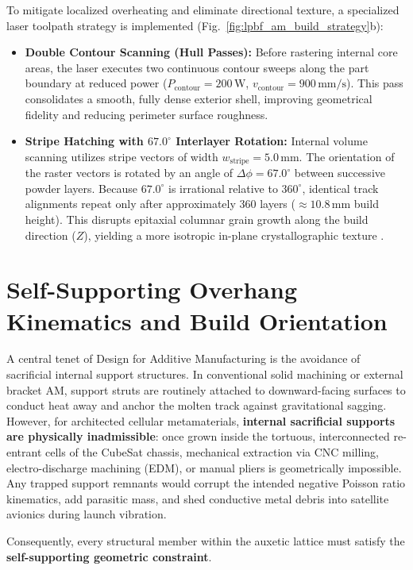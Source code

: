 To mitigate localized overheating and eliminate directional texture, a specialized laser toolpath strategy is implemented (Fig.~\ref{fig:lpbf_am_build_strategy}b):
\begin{itemize}
\item \textbf{Double Contour Scanning (Hull Passes):} Before rastering internal core areas, the laser executes two continuous contour sweeps along the part boundary at reduced power ($P_{\text{contour}} = 200\,\text{W}$, $v_{\text{contour}} = 900\,\text{mm/s}$). This pass consolidates a smooth, fully dense exterior shell, improving geometrical fidelity and reducing perimeter surface roughness.
\item \textbf{Stripe Hatching with $67.0^\circ$ Interlayer Rotation:} Internal volume scanning utilizes stripe vectors of width $w_{\text{stripe}} = 5.0\,\text{mm}$. The orientation of the raster vectors is rotated by an angle of $\Delta \phi = 67.0^\circ$ between successive powder layers. Because $67.0^\circ$ is irrational relative to $360^\circ$, identical track alignments repeat only after approximately 360 layers ($\approx 10.8\,\text{mm}$ build height). This disrupts epitaxial columnar grain growth along the build direction ($Z$), yielding a more isotropic in-plane crystallographic texture \cite{thijs2013}.
\end{itemize}

\section{Self-Supporting Overhang Kinematics and Build Orientation}
\label{sec:overhang_kinematics}

A central tenet of Design for Additive Manufacturing is the avoidance of sacrificial internal support structures. In conventional solid machining or external bracket AM, support struts are routinely attached to downward-facing surfaces to conduct heat away and anchor the molten track against gravitational sagging. However, for architected cellular metamaterials, \textbf{internal sacrificial supports are physically inadmissible}: once grown inside the tortuous, interconnected re-entrant cells of the CubeSat chassis, mechanical extraction via CNC milling, electro-discharge machining (EDM), or manual pliers is geometrically impossible. Any trapped support remnants would corrupt the intended negative Poisson ratio kinematics, add parasitic mass, and shed conductive metal debris into satellite avionics during launch vibration.

Consequently, every structural member within the auxetic lattice must satisfy the \textbf{self-supporting geometric constraint}.

